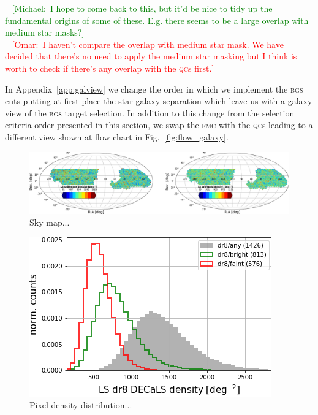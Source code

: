 \documentclass[fleqn,usenatbib]{mnras}
\newcommand{\mike}[1]{~\newline\noindent \textcolor{Green}{{ [Michael:~{#1}]\\}}}
\newcommand{\omar}[1]{~\newline\noindent \textcolor{red}{{ [Omar:~{#1}]\\}}}
\newcommand{\BGS}{\textsc{bgs}\xspace}
\newcommand{\FMC}{{\textsc{fmc}}\xspace}
\newcommand{\QCs}{\textsc{qc}s\xspace}
\begin{document}
\mike{I hope to come back to this, but it'd be nice to tidy up the fundamental origins of some of these.  E.g. there seems to be a large overlap with medium star masks?}
\omar{I haven't compare the overlap with medium star mask. We have decided that there's no need to apply the medium star masking but I think is worth to check if there's any overlap with the \QCs first.}

In  Appendix~\ref{app:galview} we change the order in which we implement the \BGS cuts putting at first place the star-galaxy separation which leave us with a galaxy view of the \BGS target selection. In addition to this change from the selection criteria order presented in this section, we swap the \FMC with the \QCs leading to a different view shown at flow chart in Fig.~\ref{fig:flow_galaxy}. 


\begin{figure}
	\includegraphics[width=17cm]{images/skymaps_bright_faint.png}
    \caption{Sky map...}
    \label{fig:skymap_densities}
\end{figure}

\begin{figure}
	\includegraphics[width=\columnwidth]{images/pixhist_bright_faint.png}
    \caption{Pixel density distribution...}
    \label{fig:pixdens}
\end{figure}
\end{document}
